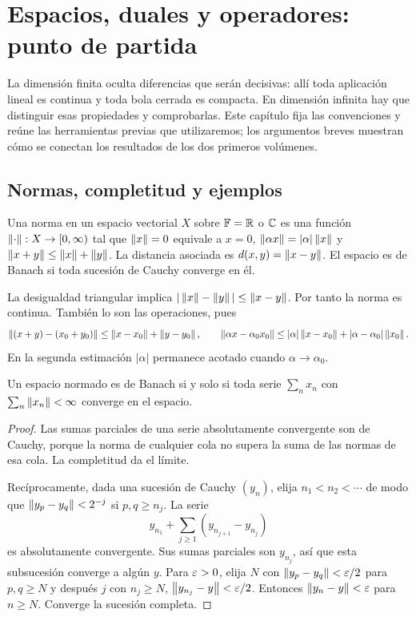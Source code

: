 \chapter{Espacios, duales y operadores: punto de partida}\label{cap:v3-01}
La dimensión finita oculta diferencias que serán decisivas: allí toda aplicación lineal es continua y toda bola cerrada es compacta. En dimensión infinita hay que distinguir esas propiedades y comprobarlas. Este capítulo fija las convenciones y reúne las herramientas previas que utilizaremos; los argumentos breves muestran cómo se conectan los resultados de los dos primeros volúmenes.

\section{Normas, completitud y ejemplos}\label{lec:v3-00}
\begin{definicion}
Una norma en un espacio vectorial $X$ sobre $\mathbb F=\mathbb R$ o $\mathbb C$ es una función $\left\lVert\cdot\right\rVert:X\to[0,\infty)$ tal que $\left\lVert x\right\rVert=0$ equivale a $x=0$, $\left\lVert\alpha x\right\rVert=|\alpha|\left\lVert x\right\rVert$ y $\left\lVert x+y\right\rVert\leq\left\lVert x\right\rVert+\left\lVert y\right\rVert$. La distancia asociada es $d(x,y)=\left\lVert x-y\right\rVert$. El espacio es de Banach si toda sucesión de Cauchy converge en él.
\end{definicion}
La desigualdad triangular implica $|\left\lVert x\right\rVert-\left\lVert y\right\rVert|\leq\left\lVert x-y\right\rVert$. Por tanto la norma es continua. También lo son las operaciones, pues
\[
 \left\lVert(x+y)-(x_0+y_0)\right\rVert\leq\left\lVert x-x_0\right\rVert+\left\lVert y-y_0\right\rVert,\qquad
 \left\lVert\alpha x-\alpha_0x_0\right\rVert\leq|\alpha|\left\lVert x-x_0\right\rVert+|\alpha-\alpha_0|\left\lVert x_0\right\rVert.
\]
En la segunda estimación $|\alpha|$ permanece acotado cuando $\alpha\to\alpha_0$.

\begin{proposicion}\label{v3:series-banach}
Un espacio normado es de Banach si y solo si toda serie $\sum_nx_n$ con $\sum_n\left\lVert x_n\right\rVert<\infty$ converge en el espacio.
\end{proposicion}
\begin{proof}
Las sumas parciales de una serie absolutamente convergente son de Cauchy, porque la norma de cualquier cola no supera la suma de las normas de esa cola. La completitud da el límite.

Recíprocamente, dada una sucesión de Cauchy $(y_n)$, elija $n_1<n_2<\cdots$ de modo que $\left\lVert y_p-y_q\right\rVert<2^{-j}$ si $p,q\geq n_j$. La serie
\[
 y_{n_1}+\sum_{j\geq1}(y_{n_{j+1}}-y_{n_j})
\]
es absolutamente convergente. Sus sumas parciales son $y_{n_j}$, así que esta subsucesión converge a algún $y$. Para $\varepsilon>0$, elija $N$ con $\left\lVert y_p-y_q\right\rVert<\varepsilon/2$ para $p,q\geq N$ y después $j$ con $n_j\geq N$, $\left\lVert y_{n_j}-y\right\rVert<\varepsilon/2$. Entonces $\left\lVert y_n-y\right\rVert<\varepsilon$ para $n\geq N$. Converge la sucesión completa.
\end{proof}

